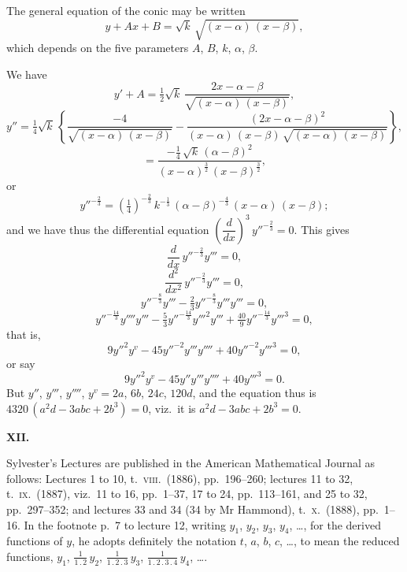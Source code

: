 \documentclass[11pt]{article}
\begin{document}
The general equation of the conic may be written
\[
y + A x + B = \sqrt{k}\,\sqrt{(x - \alpha)\,(x - \beta)},
\]
which depends on the five parameters $A$, $B$, $k$, $\alpha$, $\beta$.

We have
\[
y' + A = \tfrac{1}{2}\sqrt{k}\,\frac{2 x - \alpha - \beta}{\sqrt{(x - \alpha)\,(x - \beta)}},
\]
\[
y'' = \tfrac{1}{4}\sqrt{k}\,\left\{\frac{-4}{\sqrt{(x - \alpha)\,(x - \beta)}} - \frac{(2 x - \alpha - \beta)^2}{(x - \alpha)\,(x - \beta)\,\sqrt{(x - \alpha)\,(x - \beta)}}\right\},
\]
\[
= \frac{-\tfrac{1}{4}\,\sqrt{k}\,(\alpha - \beta)^2}{(x - \alpha)^{\tfrac{3}{2}}\,(x - \beta)^{\tfrac{3}{2}}},
\]
or
\[
y''^{-\tfrac{2}{3}} = (\tfrac{1}{4})^{-\tfrac{2}{3}}\,k^{-\tfrac{1}{3}}\,(\alpha - \beta)^{-\tfrac{4}{3}}\,(x - \alpha)\,(x - \beta);
\]
and we have thus the differential equation $\left(\dfrac{d}{dx}\right)^3\,y''^{-\tfrac{2}{3}} = 0$. This gives
\[
\frac{d}{dx}\,y''^{-\tfrac{2}{3}} y''' = 0,
\]
\[
\frac{d^2}{dx^2}\,y''^{-\tfrac{2}{3}} y''' = 0,
\]
\[
y''^{-\tfrac{8}{3}} y''' - \tfrac{2}{3} y''^{-\tfrac{8}{3}} y''' y''' = 0,
\]
\[
y''^{-\tfrac{14}{3}} y'''' y''' - \tfrac{5}{3} y''^{-\tfrac{14}{3}} y'''^2 y''' + \tfrac{40}{9} y''^{-\tfrac{14}{3}} y'''^3 = 0,
\]
that is,
\[
9 y''^2 y^v - 45 y''^{-2} y''' y'''' + 40 y''^{-2} y'''^3 = 0,
\]
or say
\[
9 y''^2 y^v - 45 y'' y''' y'''' + 40 y'''^3 = 0.
\]
But $y''$, $y'''$, $y''''$, $y^v = 2 a$, $6 b$, $24 c$, $120 d$, and the equation thus is $4320\,(a^2 d - 3 a b c + 2 b^3) = 0$, viz.\ it is $a^2 d - 3 a b c + 2 b^3 = 0$.

\medskip
\begin{center}\textbf{XII.}\end{center}

Sylvester's Lectures are published in the American Mathematical Journal as follows: Lectures 1 to 10, t.\ \textsc{viii}.\ (1886), pp.\ 196--260; lectures 11 to 32, t.\ \textsc{ix}.\ (1887), viz.\ 11 to 16, pp.\ 1--37, 17 to 24, pp.\ 113--161, and 25 to 32, pp.\ 297--352; and lectures 33 and 34 (34 by Mr Hammond), t.\ \textsc{x}.\ (1888), pp.\ 1--16. In the footnote p.\ 7 to lecture 12, writing $y_1$, $y_2$, $y_3$, $y_4$, \ldots, for the derived functions of $y$, he adopts definitely the notation $t$, $a$, $b$, $c$, \ldots, to mean the reduced functions, $y_1$, $\tfrac{1}{1\,.\,2}\,y_2$, $\tfrac{1}{1\,.\,2\,.\,3}\,y_3$, $\tfrac{1}{1\,.\,2\,.\,3\,.\,4}\,y_4$, \ldots.
\end{document}
